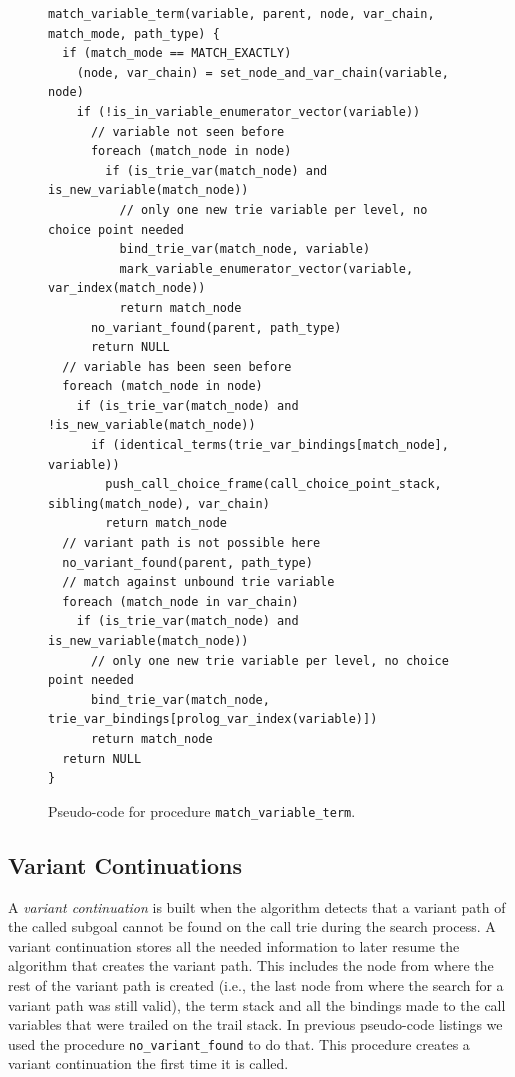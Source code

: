 \begin{figure}[ht]
\begin{Verbatim}
match_variable_term(variable, parent, node, var_chain, match_mode, path_type) {
  if (match_mode == MATCH_EXACTLY)
    (node, var_chain) = set_node_and_var_chain(variable, node)
    if (!is_in_variable_enumerator_vector(variable))
      // variable not seen before
      foreach (match_node in node)
        if (is_trie_var(match_node) and is_new_variable(match_node))
          // only one new trie variable per level, no choice point needed
          bind_trie_var(match_node, variable)
          mark_variable_enumerator_vector(variable, var_index(match_node))
          return match_node
      no_variant_found(parent, path_type)
      return NULL
  // variable has been seen before
  foreach (match_node in node)
    if (is_trie_var(match_node) and !is_new_variable(match_node))
      if (identical_terms(trie_var_bindings[match_node], variable))
        push_call_choice_frame(call_choice_point_stack, sibling(match_node), var_chain)
        return match_node
  // variant path is not possible here
  no_variant_found(parent, path_type)
  // match against unbound trie variable
  foreach (match_node in var_chain)
    if (is_trie_var(match_node) and is_new_variable(match_node))
      // only one new trie variable per level, no choice point needed
      bind_trie_var(match_node, trie_var_bindings[prolog_var_index(variable)])
      return match_node
  return NULL
}
\end{Verbatim}
\caption{Pseudo-code for procedure \texttt{match\_variable\_term}.}
\label{fig:match_variable}
\end{figure}

\subsection{Variant Continuations}

A \textit{variant continuation} is built when the algorithm detects that a variant path of the
called subgoal cannot be found on the call trie during the search process.
A variant continuation stores all the needed information to later resume
the algorithm that creates the variant path. This includes the node from where the rest of the variant
path is created (i.e., the last node from where the search for a variant path was still valid),
the term stack and all the bindings made to the call variables that were trailed on the trail stack.
In previous pseudo-code listings we used the procedure \texttt{no\_variant\_found} to do that.
This procedure creates a variant continuation the first time it is called.

